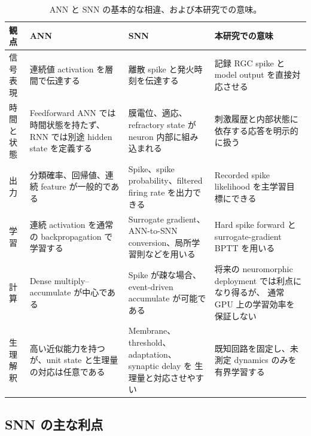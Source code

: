 \documentclass[a4paper,10pt,twocolumn,uplatex,dvipdfmx]{jsarticle}
\begin{document}
\begin{table}[t]
\centering
\caption{ANN と SNN の基本的な相違、および本研究での意味。}
\label{tab:ann-snn-comparison}
\small
\setlength{\tabcolsep}{4pt}
\begin{tabularx}{0.98\textwidth}{
  >{\raggedright\arraybackslash}p{}
  >{\raggedright\arraybackslash}p{}
  >{\raggedright\arraybackslash}p{}
  Y}
\toprule
\textbf{観点} &
\textbf{ANN} &
\textbf{SNN} &
\textbf{本研究での意味} \\
\midrule

信号表現 &
連続値 activation を層間で伝達する &
離散 spike と発火時刻を伝達する &
記録 RGC spike と model output を直接対応させる \\

時間と状態 &
Feedforward ANN では時間状態を持たず、
RNN では別途 hidden state を定義する &
膜電位、適応、refractory state が neuron 内部に組み込まれる &
刺激履歴と内部状態に依存する応答を明示的に扱う \\

出力 &
分類確率、回帰値、連続 feature が一般的である &
Spike、spike probability、filtered firing rate を出力できる &
Recorded spike likelihood を主学習目標にできる \\

学習 &
連続 activation を通常の backpropagation で学習する
\cite{lecun2015} &
Surrogate gradient、ANN-to-SNN conversion、局所学習則などを用いる
\cite{neftci2019,rueckauer2017} &
Hard spike forward と surrogate-gradient BPTT を用いる \\

計算 &
Dense multiply--accumulate が中心である &
Spike が疎な場合、event-driven accumulate が可能である &
将来の neuromorphic deployment では利点になり得るが、
通常 GPU 上の学習効率を保証しない \\

生理解釈 &
高い近似能力を持つが、unit state と生理量の対応は任意である &
Membrane、threshold、adaptation、synaptic delay を
生理量と対応させやすい &
既知回路を固定し、未測定 dynamics のみを有界学習する \\

\bottomrule
\end{tabularx}
\end{table}

\subsection{SNN の主な利点}
\end{document}

